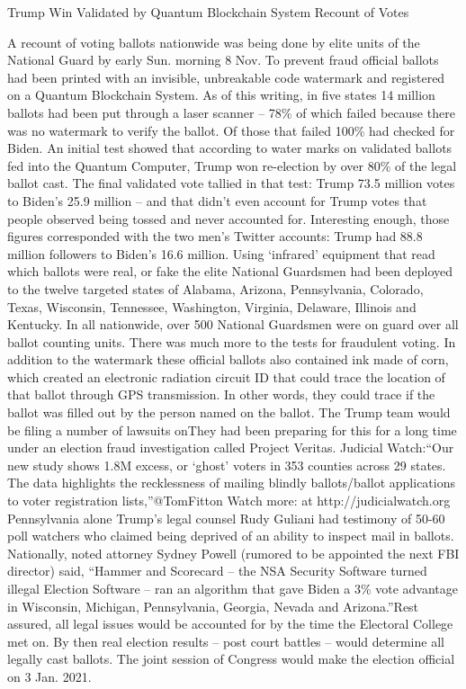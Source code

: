 \begin{table}[htbp]
    \centering
    \begin{minipage}{0.9\linewidth}
        \begin{center}
            \small{Trump Win Validated by Quantum Blockchain System Recount of Votes}
        \end{center}
        \scriptsize{
            A recount of voting ballots nationwide was being done by elite units of the National Guard by early Sun. morning 8 Nov. To prevent fraud official ballots had been printed with an invisible, unbreakable code watermark and registered on a Quantum Blockchain System. As of this writing, in five states 14 million ballots had been put through a laser scanner – 78\% of which failed because there was no watermark to verify the ballot. Of those that failed 100\% had checked for Biden. An initial test showed that according to water marks on validated ballots fed into the Quantum Computer, Trump won re-election by over 80\% of the legal ballot cast. The final validated vote tallied in that test: Trump 73.5 million votes to Biden’s 25.9 million – and that didn’t even account for Trump votes that people observed being tossed and never accounted for. Interesting enough, those figures corresponded with the two men’s Twitter accounts: Trump had 88.8 million followers to Biden’s 16.6 million. Using ‘infrared’ equipment that read which ballots were real, or fake the elite National Guardsmen had been deployed to the twelve targeted states of Alabama, Arizona, Pennsylvania, Colorado, Texas, Wisconsin, Tennessee, Washington, Virginia, Delaware, Illinois and Kentucky. In all nationwide, over 500 National Guardsmen were on guard over all ballot counting units. There was much more to the tests for fraudulent voting. In addition to the watermark these official ballots also contained ink made of corn, which created an electronic radiation circuit ID that could trace the location of that ballot through GPS transmission. In other words, they could trace if the ballot was filled out by the person named on the ballot. The Trump team would be filing a number of lawsuits onThey had been preparing for this for a long time under an election fraud investigation called Project Veritas. Judicial Watch:“Our new study shows 1.8M excess, or ‘ghost’ voters in 353 counties across 29 states. The data highlights the recklessness of mailing blindly ballots/ballot applications to voter registration lists,”@TomFitton Watch more: at http://judicialwatch.org Pennsylvania alone Trump’s legal counsel Rudy Guliani had testimony of 50-60 poll watchers who claimed being deprived of an ability to inspect mail in ballots. Nationally, noted attorney Sydney Powell (rumored to be appointed the next FBI director) said, “Hammer and Scorecard – the NSA Security Software turned illegal Election Software – ran an algorithm that gave Biden a 3\% vote advantage in Wisconsin, Michigan, Pennsylvania, Georgia, Nevada and Arizona.”Rest assured, all legal issues would be accounted for by the time the Electoral College met on. By then real election results – post court battles – would determine all legally cast ballots. The joint session of Congress would make the election official on 3 Jan. 2021.}

\end{minipage}
\end{table}
